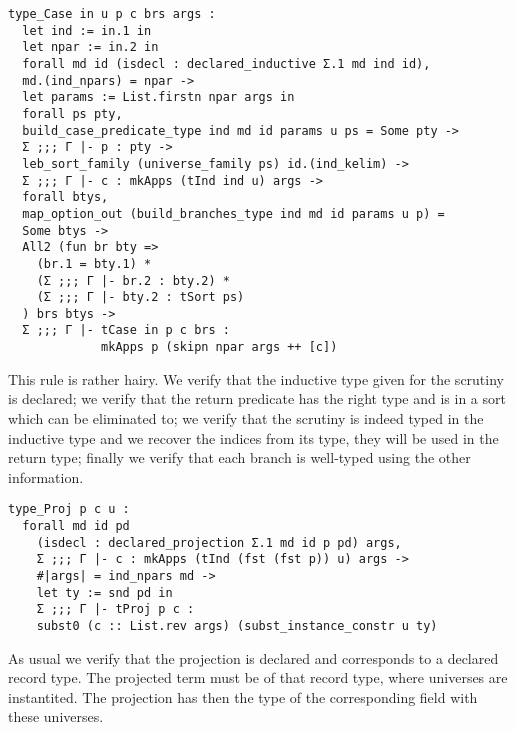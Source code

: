 \begin{verbatim}
type_Case in u p c brs args :
  let ind := in.1 in
  let npar := in.2 in
  forall md id (isdecl : declared_inductive Σ.1 md ind id),
  md.(ind_npars) = npar ->
  let params := List.firstn npar args in
  forall ps pty,
  build_case_predicate_type ind md id params u ps = Some pty ->
  Σ ;;; Γ |- p : pty ->
  leb_sort_family (universe_family ps) id.(ind_kelim) ->
  Σ ;;; Γ |- c : mkApps (tInd ind u) args ->
  forall btys,
  map_option_out (build_branches_type ind md id params u p) =
  Some btys ->
  All2 (fun br bty =>
    (br.1 = bty.1) *
    (Σ ;;; Γ |- br.2 : bty.2) *
    (Σ ;;; Γ |- bty.2 : tSort ps)
  ) brs btys ->
  Σ ;;; Γ |- tCase in p c brs :
             mkApps p (skipn npar args ++ [c])
\end{verbatim}
This rule is rather hairy. We verify that the inductive type given for the
scrutiny is declared; we verify that the return predicate has the right type and
is in a sort which can be eliminated to; we verify that the scrutiny is indeed
typed in the inductive type and we recover the indices from its type, they will
be used in the return type; finally we verify that each branch is well-typed
using the other information.

\begin{verbatim}
type_Proj p c u :
  forall md id pd
    (isdecl : declared_projection Σ.1 md id p pd) args,
    Σ ;;; Γ |- c : mkApps (tInd (fst (fst p)) u) args ->
    #|args| = ind_npars md ->
    let ty := snd pd in
    Σ ;;; Γ |- tProj p c :
    subst0 (c :: List.rev args) (subst_instance_constr u ty)
\end{verbatim}
As usual we verify that the projection is declared and corresponds to a declared
record type. The projected term must be of that record type, where universes
are instantited. The projection has then the type of the corresponding field
with these universes.

